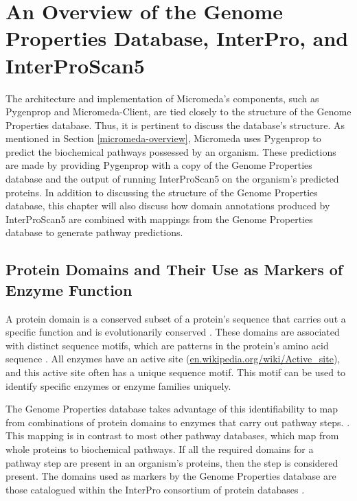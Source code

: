 \chapter{An Overview of the Genome Properties Database, InterPro, and InterProScan5} \label{genome-properties} 

The architecture and implementation of Micromeda's components, such as Pygenprop and Micromeda-Client, are tied closely to the structure of the Genome Properties database. Thus, it is pertinent to discuss the database's structure. As mentioned in Section \ref{micromeda-overview}, Micromeda uses Pygenprop to predict the biochemical pathways possessed by an organism. These predictions are made by providing Pygenprop with a copy of the Genome Properties database and the output of running InterProScan5 on the organism's predicted proteins. In addition to discussing the structure of the Genome Properties database, this chapter will also discuss how domain annotations produced by InterProScan5 are combined with mappings from the Genome Properties database to generate pathway predictions.

\section{Protein Domains and Their Use as Markers of Enzyme Function}

A protein domain is a conserved subset of a protein's sequence that carries out a specific function and is evolutionarily conserved \cite{ren2008conservation}. These domains are associated with distinct sequence motifs, which are patterns in the protein's amino acid sequence \cite{ren2008conservation}. All enzymes have an active site (\href{en.wikipedia.org/wiki/Active\_site}{en.wikipedia.org/wiki/Active\_site}), and this active site often has a unique sequence motif. This motif can be used to identify specific enzymes or enzyme families \cite{ren2008conservation} uniquely. 

The Genome Properties database takes advantage of this identifiability to map from combinations of protein domains to enzymes that carry out pathway steps. \cite{richardson2018genome}. This mapping is in contrast to most other pathway databases, which map from whole proteins to biochemical pathways. If all the required domains for a pathway step are present in an organism's proteins, then the step is considered present. The domains used as markers by the Genome Properties database are those catalogued within the InterPro consortium of protein databases \cite{apweiler2000interpro,richardson2018genome}. 

